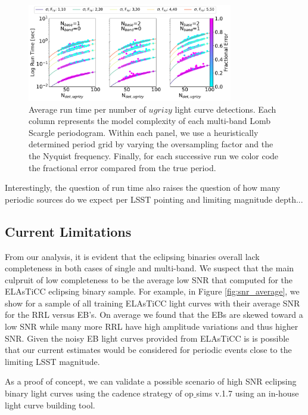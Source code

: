 \documentclass[DM,authoryear,toc]{lsstdoc}
\begin{document}
\begin{figure}
  \includegraphics[width=0.8\textwidth]{figures/multi-lsp-runs.pdf}
  \centering 
  \caption{Average run time per number of $ugrizy$ light curve detections. Each column represents the model complexity of each multi-band Lomb Scargle periodogram. Within each panel, we use a heuristically determined period grid by varying the oversampling factor and the the Nyquist frequency.  Finally, for each successive run we color code the fractional error compared from the true period.}
 \label{fig:run_time_multi}
\end{figure}


Interestingly, the question of run time also raises the question of how many periodic sources do we expect per LSST pointing and limiting magnitude depth...


\subsection{Current Limitations}\label{sec:limitations}

From our analysis, it is evident that the eclipsing binaries overall lack completeness in both cases of single and multi-band. We suspect that the main culpruit of low completeness to be the average low SNR that computed for the ELAsTiCC eclipsing binary sample. For example, in Figure \ref{fig:snr_average}, we show for a sample of all training ELAsTiCC light curves with their average SNR for the RRL versus EB's. On average we found that the EBs are skewed toward a low SNR while many more RRL have high amplitude variations and thus higher SNR. Given the noisy EB light curves provided from ELAsTiCC is is possible that our current estimates would be considered for periodic events close to the limiting LSST magnitude. 

As a proof of concept, we can validate a possible scenario of high SNR eclipsing binary light curves using the cadence strategy of op$\_$sims v.1.7 using an in-house light curve building tool. 
\end{document}
